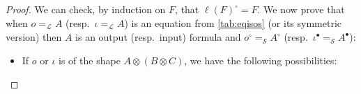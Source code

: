 \documentclass{lmcs}
\newcommand*{\orth}{^\perp} %
\newcommand*{\tens}{\otimes} %
\newcommand*{\lolipop}{\multimap} %
\newcommand*{\resp}{resp.}
\newcommand*{\Eu}{\mathcal{L}} %
\newcommand*{\eqeq}{=} %
\newcommand*{\eqEu}[1][]{\eqeq_{\Eu_{#1}}} %
\newcommand*{\isom}{\eqEu} %
\newcommand*{\thS}{\mathcal{S}}
\newcommand*{\isoo}{\eqeq_\thS} %
\newcommand*{\iform}{\iota}
\newcommand*{\tradm}[1]{\ell(#1)}
\newcommand*{\tradi}[1]{{#1}^\bullet}
\newcommand*{\trado}[1]{{#1}^\circ}
\newcommand*{\bigtrado}[1]{\trado{(#1)}}
\begin{document}
\begin{proof}
We can check, by induction on $F$, that $\trado{\tradm{F}} = F$.
We now prove that when $o\isom A$ (\resp\ $\iform\isom A$) is an equation from \autoref{tab:eqisos} (or its symmetric version) then $A$ is an output (\resp\ input) formula and $\trado{o}\isoo\trado{A}$ (\resp\ $\tradi{\iform}\isoo\tradi{A}$):
\begin{itemize}
\item If $o$ or $\iform$ is of the shape $A\tens(B\tens C)$, we have the following possibilities:

\end{itemize}
\end{proof}
\end{document}
